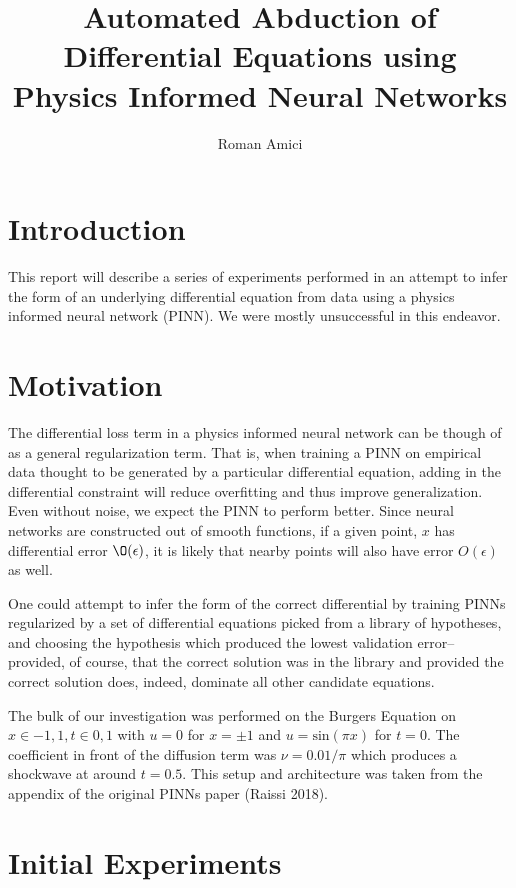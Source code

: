 \documentclass[12pt, fullpage,letterpaper]{article}
\title{Automated Abduction of Differential Equations using Physics Informed Neural Networks}
\author{Roman Amici}
\begin{document}
\maketitle

\section{Introduction}

This report will describe a series of experiments performed in an attempt to infer the form of an underlying differential equation from data using a physics informed neural network (PINN). We were mostly unsuccessful in this endeavor.

\section{Motivation}

The differential loss term in a physics informed neural network can be though of as a general regularization term. That is, when training a PINN on empirical data thought to be generated by a particular differential equation, adding in the differential constraint will reduce overfitting and thus improve generalization. Even without noise, we expect the PINN to perform better. Since neural networks are constructed out of smooth functions, if a given point, $x$ has differential error $\O(\epsilon)$, it is likely that nearby points will also have error $O(\epsilon)$ as well.

One could attempt to infer the form of the correct differential by training PINNs regularized by a set of differential equations picked from a library of hypotheses, and choosing the hypothesis which produced the lowest validation error-- provided, of course, that the correct solution was in the library and provided the correct solution does, indeed, dominate all other candidate equations.

The bulk of our investigation was performed on the Burgers Equation on $x \in {-1,1}, t \in {0,1}$ with $u = 0$ for $x = \pm 1$ and $u = \text{sin}(\pi x)$ for $t=0$. The coefficient in front of the diffusion term was $\nu=0.01/\pi$ which produces a shockwave at around $t=0.5$. This setup and architecture was taken from the appendix of the original PINNs paper (Raissi 2018).

\section{Initial Experiments}
\end{document}
